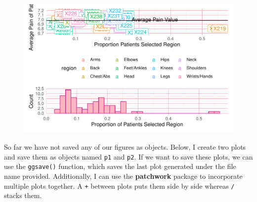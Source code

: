 \documentclass[
  letterpaper,
]{krantz}
\begin{document}
\begin{figure}[H]

{\centering \includegraphics[width=1\textwidth,height=\textheight]{book/7_visualization_ggplot_files/figure-pdf/unnamed-chunk-22-1.pdf}

}

\end{figure}

So far we have not saved any of our figures as objects. Below, I create
two plots and save them as objects named \texttt{p1} and \texttt{p2}. If
we want to save these plots, we can use the \texttt{ggsave()} function,
which saves the last plot generated under the file name provided.
Additionally, I can use the \textbf{patchwork} package to incorporate
multiple plots together. A \texttt{+} between plots puts them side by
side whereas \texttt{/} stacks them.
\end{document}
